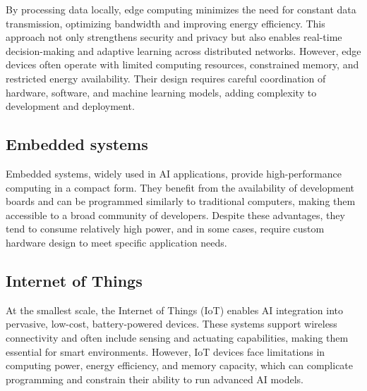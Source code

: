 By processing data locally, edge computing minimizes the need for constant data transmission, optimizing bandwidth and improving energy efficiency. 
This approach not only strengthens security and privacy but also enables real-time decision-making and adaptive learning across distributed networks. 
However, edge devices often operate with limited computing resources, constrained memory, and restricted energy availability. 
Their design requires careful coordination of hardware, software, and machine learning models, adding complexity to development and deployment.

\subsection{Embedded systems}
Embedded systems, widely used in AI applications, provide high-performance computing in a compact form. 
They benefit from the availability of development boards and can be programmed similarly to traditional computers, making them accessible to a broad community of developers. 
Despite these advantages, they tend to consume relatively high power, and in some cases, require custom hardware design to meet specific application needs.

\subsection{Internet of Things}
At the smallest scale, the Internet of Things (IoT) enables AI integration into pervasive, low-cost, battery-powered devices. 
These systems support wireless connectivity and often include sensing and actuating capabilities, making them essential for smart environments. 
However, IoT devices face limitations in computing power, energy efficiency, and memory capacity, which can complicate programming and constrain their ability to run advanced AI models.